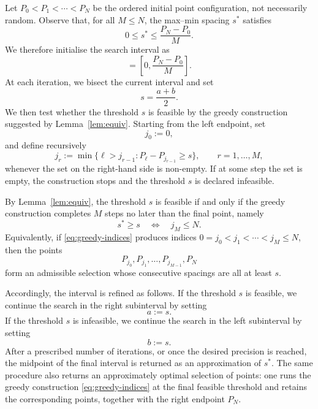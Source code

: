 \documentclass[a4paper,reqno,11pt]{amsart}
\numberwithin{equation}{section}
\numberwithin{thm}{section}
\theoremstyle{plain}
\theoremstyle{definition}
\begin{document}
{Let $ P_0<P_1<\cdots<P_N$
be the ordered initial point configuration, not necessarily random. 
Observe that, for all $M\leq N$, the max--min spacing $s^*$ satisfies
\begin{equation}
    0\leq s^* \leq \frac{P_N-P_0}{M}.
\end{equation}
We therefore initialise the search interval as
\begin{equation}
    [a,b]=\left[0,\frac{P_N-P_0}{M}\right].
\end{equation}
At each iteration, we bisect the current interval and set
\begin{equation}
    s=\frac{a+b}{2}.
\end{equation}
We then test whether the threshold $s$ is feasible by the greedy construction
suggested by Lemma~\ref{lem:equiv}. Starting from the left endpoint, set
\begin{equation}
    j_0:=0,
\end{equation}
and define recursively
\begin{equation}
    j_r:=\min\{\ell>j_{r-1}: P_\ell-P_{j_{r-1}}\geq s\},
    \qquad r=1,\ldots,M,
    \label{eq:greedy-indices}
\end{equation}
whenever the set on the right-hand side is non-empty. If at some step the set
is empty, the construction stops and the threshold $s$ is declared infeasible.

By Lemma~\ref{lem:equiv}, the threshold $s$
is feasible if and only if the greedy construction completes $M$ steps no
later than the final point, namely
\begin{equation}
    s^*\geq s
    \quad\Longleftrightarrow\quad
    j_M\leq N.
    \label{eq:feasibility-test}
\end{equation}
Equivalently, if \eqref{eq:greedy-indices} produces indices
$0=j_0<j_1<\cdots<j_M\leq N$, then the points
\begin{equation}
    P_{j_0},P_{j_1},\ldots,P_{j_{M-1}},P_N
\end{equation}
form an admissible selection whose consecutive spacings are all at least $s$.

Accordingly, the interval is refined as follows. If the threshold $s$ is
feasible, we continue the search in the right subinterval by setting
\begin{equation}
    a:=s.
\end{equation}
If the threshold $s$ is infeasible, we continue the search in the left
subinterval by setting
\begin{equation}
    b:=s.
\end{equation}
After a prescribed number of iterations, or once the desired precision is
reached, the midpoint of the final interval is returned as an approximation of
$s^*$.
The same procedure also returns an approximately optimal selection of points:
one runs the greedy construction \eqref{eq:greedy-indices} at the final feasible
threshold and retains the corresponding points, together with the right
endpoint $P_N$.

}
\end{document}
